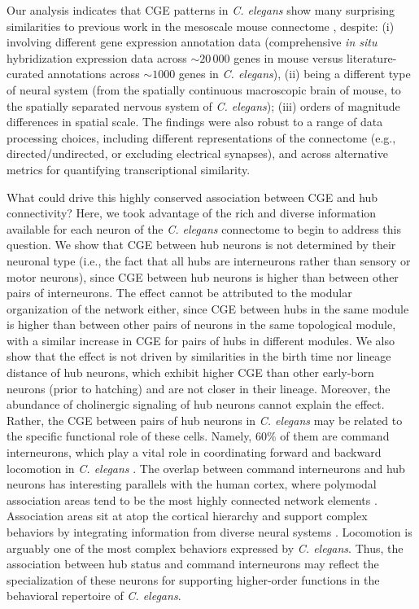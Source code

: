 {Our analysis indicates that CGE patterns in \emph{C. elegans} show many surprising similarities to previous work in the mesoscale mouse connectome \citep{Fulcher2016}, despite:
(i) involving different gene expression annotation data (comprehensive \emph{in situ} hybridization expression data across $\sim20\,000$ genes in mouse versus literature-curated annotations across $\sim 1000$ genes in \emph{C. elegans}),
(ii) being a different type of neural system (from the spatially continuous macroscopic brain of mouse, to the spatially separated nervous system of \emph{C. elegans});
(iii) orders of magnitude differences in spatial scale.
The findings were also robust to a range of data processing choices, including different representations of the connectome (e.g., directed/undirected, or excluding electrical synapses), and across alternative metrics for quantifying transcriptional similarity.

What could drive this highly conserved association between CGE and hub connectivity?
Here, we took advantage of the rich and diverse information available for each neuron of the \emph{C. elegans} connectome to begin to address this question.
We show that CGE between hub neurons is not determined by their neuronal type (i.e., the fact that all hubs are interneurons rather than sensory or motor neurons), since CGE between hub neurons is higher than between other pairs of interneurons.
The effect cannot be attributed to the modular organization of the network either, since CGE between hubs in the same module is higher than between other pairs of neurons in the same topological module, with a similar increase in CGE for pairs of hubs in different modules.
We also show that the effect is not driven by similarities in the birth time nor lineage distance of hub neurons, which exhibit higher CGE than other early-born neurons (prior to hatching) and are not closer in their lineage.
Moreover, the abundance of cholinergic signaling of hub neurons cannot explain the effect.
Rather, the CGE between pairs of hub neurons in \textit{C. elegans} may be related to the specific functional role of these cells.
Namely, 60\% of them are command interneurons, which play a vital role in coordinating forward and backward locomotion in \textit{C. elegans} \citep{Kim2016}.
The overlap between command interneurons and hub neurons has interesting parallels with the human cortex, where polymodal association areas tend to be the most highly connected network elements \citep{VandenHeuvel2016}.
Association areas sit at atop the cortical hierarchy and support complex behaviors by integrating information from diverse neural systems \citep{Mesulam1998}.
Locomotion is arguably one of the most complex behaviors expressed by \emph{C. elegans}.
Thus, the association between hub status and command interneurons may reflect the specialization of these neurons for supporting higher-order functions in the behavioral repertoire of \emph{C. elegans}.

}
